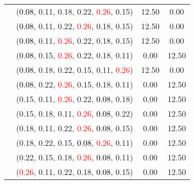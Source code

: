 \documentclass[10pt,a4paper]{report}
\begin{document}
\begin{center}
\begin{longtable}{clcc}
			&(\textcolor{black}{0.08}, 0.11, 0.18, 0.22, \textcolor{red}{0.26}, 0.15)&12.50&0.00\\
			&(\textcolor{black}{0.08}, 0.11, 0.22, \textcolor{red}{0.26}, 0.18, 0.15)&12.50&0.00\\
			&(\textcolor{black}{0.08}, 0.11, \textcolor{red}{0.26}, 0.22, 0.18, 0.15)&12.50&0.00\\
			&(\textcolor{black}{0.08}, 0.15, \textcolor{red}{0.26}, 0.22, 0.18, 0.11)&0.00&12.50\\
			&(\textcolor{black}{0.08}, 0.18, 0.22, 0.15, 0.11, \textcolor{red}{0.26})&12.50&0.00\\
			&(\textcolor{black}{0.08}, 0.22, \textcolor{red}{0.26}, 0.15, 0.18, 0.11)&0.00&12.50\\
			&(0.15, 0.11, \textcolor{red}{0.26}, 0.22, \textcolor{black}{0.08}, 0.18)&0.00&12.50\\
			&(0.15, 0.18, 0.11, \textcolor{red}{0.26}, \textcolor{black}{0.08}, 0.22)&0.00&12.50\\
			&(0.18, 0.11, 0.22, \textcolor{red}{0.26}, \textcolor{black}{0.08}, 0.15)&0.00&12.50\\
			&(0.18, 0.22, 0.15, \textcolor{black}{0.08}, \textcolor{red}{0.26}, 0.11)&0.00&12.50\\
			&(0.22, 0.15, 0.18, \textcolor{red}{0.26}, \textcolor{black}{0.08}, 0.11)&0.00&12.50\\
			&(\textcolor{red}{0.26}, 0.11, 0.22, 0.18, \textcolor{black}{0.08}, 0.15)&0.00&12.50\\
		\bottomrule
	\end{longtable}
\end{center}
\end{document}
